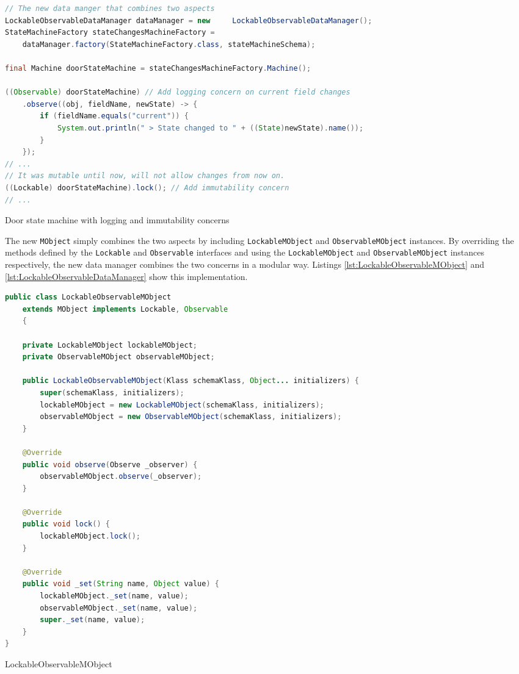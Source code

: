 \begin{sourcecode} [H]
	\begin{lstlisting}[language=Java, escapechar=|]
// The new data manger that combines two aspects
LockableObservableDataManager dataManager = new 	LockableObservableDataManager();
StateMachineFactory stateChangesMachineFactory =
	dataManager.factory(StateMachineFactory.class, stateMachineSchema);

final Machine doorStateMachine = stateChangesMachineFactory.Machine();

((Observable) doorStateMachine) // Add logging concern on current field changes
	.observe((obj, fieldName, newState) -> {
		if (fieldName.equals("current")) {
			System.out.println(" > State changed to " + ((State)newState).name());
		}
	});
// ...
// It was mutable until now, will not allow changes from now on.
((Lockable) doorStateMachine).lock(); // Add immutability concern 
// ...
	\end{lstlisting}
	\caption{Door state machine with logging and immutability concerns}
	\label{lst:StateMachineMonitoringConcernsCombination}
\end{sourcecode}

The new \texttt{MObject} simply combines the two aspects by including \texttt{LockableMObject} and \texttt{ObservableMObject} instances.
By overriding the methods defined by the \texttt{Lockable} and \texttt{Observable} interfaces and using the \texttt{LockableMObject} and \texttt{ObservableMObject} instances respectively, the new data manager combines the two concerns in a modular way.
Listings \ref{lst:LockableObservableMObject} and \ref{lst:LockableObservableDataManager} show this implementation.

\begin{sourcecode} [H]
	\begin{lstlisting}[language=Java, escapechar=|]
public class LockableObservableMObject 
	extends MObject implements Lockable, Observable 
	{

	private LockableMObject lockableMObject;
	private ObservableMObject observableMObject;

	public LockableObservableMObject(Klass schemaKlass, Object... initializers) {
		super(schemaKlass, initializers);
		lockableMObject = new LockableMObject(schemaKlass, initializers);
		observableMObject = new ObservableMObject(schemaKlass, initializers);
	}

	@Override
	public void observe(Observe _observer) {
		observableMObject.observe(_observer);
	}

	@Override
	public void lock() {
		lockableMObject.lock();
	}

	@Override
	public void _set(String name, Object value) {
		lockableMObject._set(name, value);
		observableMObject._set(name, value);
		super._set(name, value);
	}
}
	\end{lstlisting}
	\caption{LockableObservableMObject}
	\label{lst:LockableObservableMObject}
\end{sourcecode}


